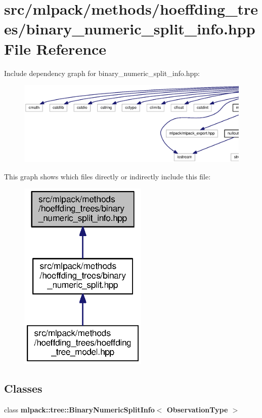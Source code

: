 \section{src/mlpack/methods/hoeffding\+\_\+trees/binary\+\_\+numeric\+\_\+split\+\_\+info.hpp File Reference}
\label{binary__numeric__split__info_8hpp}
Include dependency graph for binary\+\_\+numeric\+\_\+split\+\_\+info.\+hpp\+:
\nopagebreak
\begin{figure}[H]
\begin{center}
\leavevmode
\includegraphics[width=350pt]{binary__numeric__split__info_8hpp__incl}
\end{center}
\end{figure}
This graph shows which files directly or indirectly include this file\+:
\nopagebreak
\begin{figure}[H]
\begin{center}
\leavevmode
\includegraphics[width=173pt]{binary__numeric__split__info_8hpp__dep__incl}
\end{center}
\end{figure}
\subsection*{Classes}
\begin{DoxyCompactItemize}
\item 
class {\bf mlpack\+::tree\+::\+Binary\+Numeric\+Split\+Info$<$ Observation\+Type $>$}
\end{DoxyCompactItemize}
